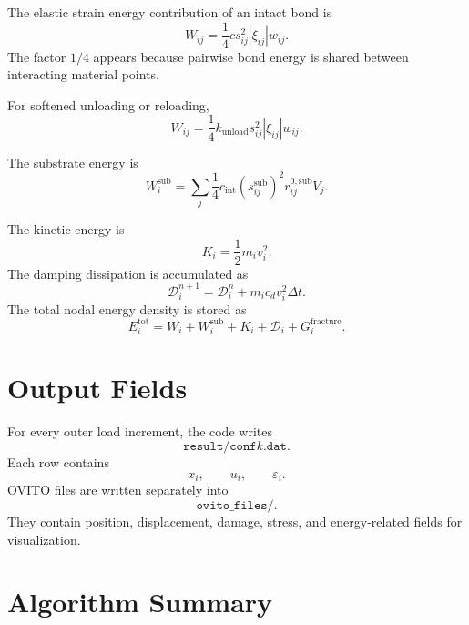 \documentclass[11pt]{article}
\begin{document}
The elastic strain energy contribution of an intact bond is
\begin{equation}
W_{ij}
=
\frac{1}{4}
c s_{ij}^2 |\xi_{ij}| w_{ij}.
\end{equation}
The factor \(1/4\) appears because pairwise bond energy is shared between interacting material points.

For softened unloading or reloading,
\begin{equation}
W_{ij}
=
\frac{1}{4}
k_{\mathrm{unload}}
s_{ij}^2
|\xi_{ij}|
w_{ij}.
\end{equation}

The substrate energy is
\begin{equation}
W_i^{\mathrm{sub}}
=
\sum_j
\frac{1}{4}
c_{\mathrm{int}}
\left(s_{ij}^{\mathrm{sub}}\right)^2
r_{ij}^{0,\mathrm{sub}}
V_j.
\end{equation}

The kinetic energy is
\begin{equation}
K_i
=
\frac{1}{2}m_i v_i^2.
\end{equation}
The damping dissipation is accumulated as
\begin{equation}
\mathcal{D}_i^{n+1}
=
\mathcal{D}_i^n
+
m_i c_d v_i^2\Delta t.
\end{equation}
The total nodal energy density is stored as
\begin{equation}
E_i^{\mathrm{tot}}
=
W_i
+
W_i^{\mathrm{sub}}
+
K_i
+
\mathcal{D}_i
+
G_i^{\mathrm{fracture}}.
\end{equation}

\section{Output Fields}

For every outer load increment, the code writes
\begin{equation}
\texttt{result/conf}k\texttt{.dat}.
\end{equation}
Each row contains
\begin{equation}
x_i,
\qquad
u_i,
\qquad
\varepsilon_i.
\end{equation}
OVITO files are written separately into
\begin{equation}
\texttt{ovito\_files/}.
\end{equation}
They contain position, displacement, damage, stress, and energy-related fields for visualization.

\section{Algorithm Summary}
\end{document}
